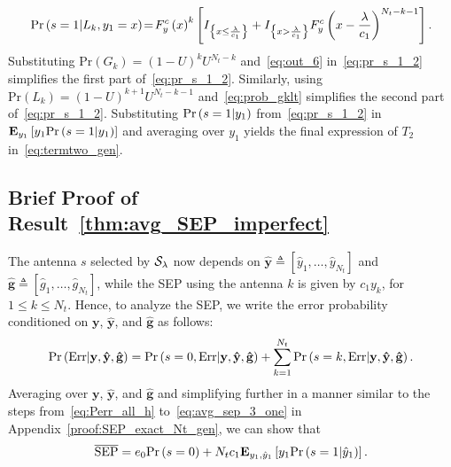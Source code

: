 \documentclass[12pt,draftcls,peerreview,onecolumn]{IEEEtran}
\newcommand{\brac}[1]{\left({#1}\right)}
\newcommand{\cbrac}[1]{\left\{{#1}\right\}}
\newcommand{\indic}[1]{I_{\cbrac{#1}}}
\newcommand{\define}{\triangleq}
\newcommand{\explow}[2]{{\bf{E}}_{#1}\left[{#2}\right]}
\newcommand{\prob}[1]{\text{Pr}\brac{#1}}
\newcommand{\given}{\arrowvert}
\newcommand{\SEP}{\text{SEP}}
\newcommand{\y}{\mathbf{y}}
\newcommand{\nx}{{0}}
\newcommand{\setG}{G}
\newcommand{\setL}{L}
\newcommand{\setGk}{\setG_k}
\newcommand{\setLk}{\setL_k}
\newcommand{\lam}{\lambda}
\newcommand{\Err}{{\text{Err}}}
\newcommand{\termtwo}{T_2}
\newcommand{\Nt}{{N_t}}
\newcommand{\puch}{g}
\newcommand{\ghatvec}{\mathbf{\hat{\puch}}}
\newcommand{\yhatvec}{\mathbf{\hat{y}}}
\newcommand{\cone}{c_{1}}
\newcommand{\lambym}{\frac{\lam}{\cone}}
\newcommand{\yk}[1]{y_{#1}}
\newcommand{\un}{U}
\newcommand{\zerosep}{e_0}
\newcommand{\callamrule}{{\cal S_{{\lam}}}}
\newcommand{\avgSEP}{\overline{\SEP}}
\newcommand{\ghat}{\hat{\puch}}
\newcommand{\gkhat}[1]{\ghat_{#1}}
\newcommand{\ykhat}[1]{\hat{y}_{#1}}
\begin{document}
\begin{equation}
\text{Pr}\brac{s =1\given \setLk,\yk{1}=x} \!=\! F_{y}^{c}\brac{x}^{k}\left[\indic{x\leq\lambym} +\indic{x>\lambym}F_{y}^{c}\brac{x-\lambym}^{\Nt-k-1}\right].
\label{eq:prob_gklt}
\end{equation}
%
Substituting $\prob{\setGk} = \left(1-\un\right)^k\un^{\Nt-k}$ and~\eqref{eq:out_6} in~\eqref{eq:pr_s_1_2} simplifies the first part of~\eqref{eq:pr_s_1_2}. Similarly, using $\prob{\setLk}=\left(1-\un\right)^{k+1}\un^{\Nt-k-1}$ and~\eqref{eq:prob_gklt} simplifies the second part of~\eqref{eq:pr_s_1_2}. Substituting $\prob{s = 1\given \yk{1}}$ from~\eqref{eq:pr_s_1_2} in $\explow{\yk{1}}{ \yk{1}\prob{s = 1\given \yk{1}}}$ and averaging over $\yk{1}$ yields the final expression of $\termtwo$ in~\eqref{eq:termtwo_gen}. 


\subsection{Brief Proof of Result~\ref{thm:avg_SEP_imperfect}}
\label{proof:avg_SEP_imperfect_CSI}
The antenna $s$ selected by $\callamrule$  now depends on $\yhatvec\define\left[\ykhat{1},\ldots,\ykhat{\Nt} \right]$ and $\ghatvec\define\left[\gkhat{1},\ldots,\gkhat{\Nt} \right]$, while the SEP using the antenna $k$ is given by $\cone\yk{k}$, for $1\leq k\leq\Nt$.  Hence, to analyze the SEP, we write the error probability conditioned on $\y$, $\yhatvec$, and $\ghatvec$ as follows:
%
\begin{equation}
\prob{\Err \given \y,\yhatvec,\ghatvec} =  \prob{s=\nx,\Err\given \y, \yhatvec,\ghatvec} + \sum_{k=1}^{\Nt}\prob{s=k,\Err\given\y,\yhatvec,\ghatvec}.
\label{eq:Perr_all_imp_csi}
\end{equation}  
%
Averaging over $\y$, $\yhatvec$, and $\ghatvec$ and simplifying further in a manner similar to the steps from~\eqref{eq:Perr_all_h} to~\eqref{eq:avg_sep_3_one} in Appendix~\ref{proof:SEP_exact_Nt_gen}, we can show that
%
\begin{equation}
\label{eq:avg_SEP_3_IMP_CSI}
\avgSEP = \zerosep \prob{s=\nx} + \Nt\cone\explow{\yk{1},\ykhat{1}}{\yk{1}\prob{s=1\given \ykhat{1}}}.
\end{equation}
%
\end{document}
